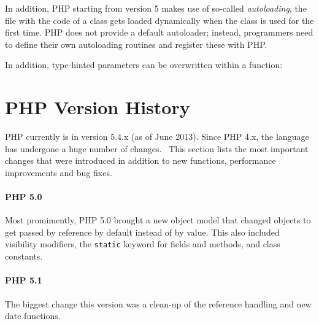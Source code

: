 In addition, PHP starting from version 5 makes use of so-called \emph{autoloading}, \ie the file with the code of a class gets loaded dynamically when the class is used for the first time. PHP does not provide a default autoloader; instead, programmers need to define their own autoloading routines and register these with PHP.~\cite{php-manual-autoloading}


In addition, type-hinted parameters can be overwritten within a function:



\section{PHP Version History}

PHP currently is in version 5.4.x (as of June 2013). Since PHP 4.x, the language has undergone a huge number of changes.~\cite{php-history, php-50, php-51, php-52, php-53, php-54} This section lists the most important changes that were introduced in addition to new functions, performance improvements and bug fixes.

\paragraph*{PHP 5.0}
Most promimently, PHP 5.0 brought a new object model that changed objects to get passed by reference by default instead of by value. This also included visibility modifiers, the \texttt{static} keyword for fields and methods, and class constants.


\paragraph*{PHP 5.1}
The biggest change this version was a clean-up of the reference handling and new date functions.


